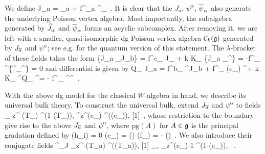 \documentclass[11pt]{amsart}
\numberwithin{equation}{section}
\numberwithin{figure}{section}
\numberwithin{table}{section}
\begin{document}
We define
\be
	J_a = _a + f^\beta_{a \alpha} \psi^\alpha \ol{\psi}_\beta~.
\ee
It is clear that the $J_a$, $\psi^\alpha$, $\overline{\psi}_\alpha$ also generate the underlying Poisson vertex algebra.
Most importantly, the subalgebra generated by $\widehat{J}_\alpha$ and $\overline{\psi}_\alpha$ forms an acyclic subcomplex.
After removing it, we are left with a smaller, quasi-isomorphic dg Poisson vertex algebra ${\mathcal C}_k(\mathfrak{g})$ generated by $J_{\overline{a}}$ and $\psi^\alpha$; see e.g. \cite{dBT94, FBZ} for the quantum version of this statement.
The $\lambda$-bracket of these fields takes the form
\be\label{eq:DSBrackets}
	\{J_{\ol a} {}_\lambda J_{\ol b}\} = f^{\ol c}_{ } J_{} + \lambda k K_{ } \qquad \{J_{\ol a} {}_\lambda \psi^\alpha\} = -f^{\alpha}_{ \beta} \psi^\beta \qquad \{\psi^\alpha {}_\lambda \psi^\beta\} = 0
\ee
and differential is given by
\be\label{eq:DSDifferential}
	Q_{} J_{\ol a} = f^{\ol b}_{\alpha {}} \psi^\alpha J_{\ol b} + f^{\alpha}_{\beta {}} \chi(e_\alpha) \psi^\beta + k K_{ \alpha} \partial \psi^\alpha \qquad Q_{} \psi^\alpha = - f^\alpha_{\beta \gamma} \psi^\beta \psi^\gamma~.
\ee

With the above dg model for the classical $W$-algebra in hand, we describe its universal bulk theory.
To construct the universal bulk, extend $J_{\overline a}$ and $\psi^\alpha$ to fields
\be
	\bJ_{} \d z^{-(T_{})} \in \bOmega^{(1-(T_{})), \bullet} \qquad \boldsymbol{\psi}^\alpha \d z^{\otimes{}(e_\alpha)} \in \bOmega^{((e_\alpha)), \bullet}[1]~,
\ee
whose restriction to the boundary give rise to the above $J_{\overline a}$ and $\psi^\alpha$, where $\mathrm{pg}(A)$ for $A \in \mathfrak{g}$ is the principal gradation defined by
\be
	(h_i) = 0 \qquad {}(e_\alpha) = (\alpha) \qquad {}(f_\alpha) = - (\alpha)~.
\ee
We also introduce their conjugate fields
\be
	\boldsymbol{\beta}^{}_J \partial_z^{\otimes-(T_{\ol a})} \in \bOmega^{((T_{\ol a})), \bullet}[1] \qquad \boldsymbol{\beta}_{\psi, \alpha} \partial_z^{\otimes {}(e_\alpha)-1} \in \bOmega^{(1-(e_\alpha)), \bullet}~.
\ee
\end{document}
